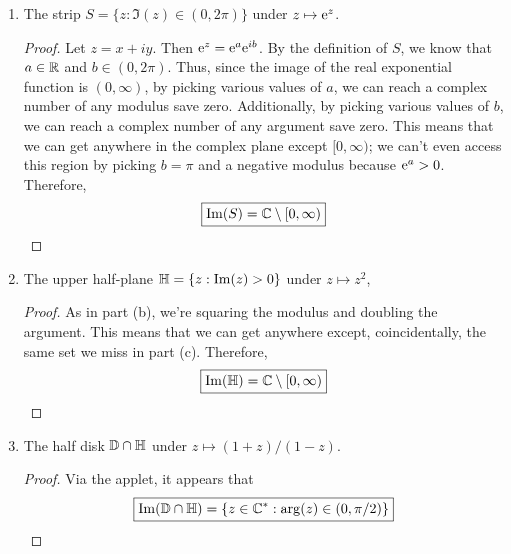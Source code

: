 \documentclass[../psets.tex]{subfiles}
\begin{document}
\begin{enumerate}[ref={A.\arabic*}]
\begin{enumerate}[ref={A.\theenumi\alph*}]
\begin{proof}
            \begin{equation*}
                \boxed{\im(\D\setminus\{0\}) = \D\setminus\{0\}}
            \end{equation*}
        \end{proof}
        \item The strip $S=\{z:\Im(z)\in(0,2\pi)\}$ under $z\mapsto\e[z]$.
        \begin{proof}
            Let $z=x+iy$. Then $\e[z]=\e[a]\e[ib]$. By the definition of $S$, we know that $a\in\R$ and $b\in(0,2\pi)$. Thus, since the image of the real exponential function is $(0,\infty)$, by picking various values of $a$, we can reach a complex number of any modulus save zero. Additionally, by picking various values of $b$, we can reach a complex number of any argument save zero. This means that we can get anywhere in the complex plane except $[0,\infty)$; we can't even access this region by picking $b=\pi$ and a negative modulus because $\e[a]>0$. Therefore,
            \begin{equation*}
                \boxed{\im(S) = \C\setminus[0,\infty)}
            \end{equation*}
        \end{proof}
        \item The upper half-plane $\Hh=\{z:\Im(z)>0\}$ under $z\mapsto z^2$,
        \begin{proof}
            As in part (b), we're squaring the modulus and doubling the argument. This means that we can get anywhere except, coincidentally, the same set we miss in part (c). Therefore,
            \begin{equation*}
                \boxed{\im(\Hh) = \C\setminus[0,\infty)}
            \end{equation*}
        \end{proof}
        \item \label{prb:1.A.5e}The half disk $\D\cap\Hh$ under $z\mapsto(1+z)/(1-z)$.
        \begin{proof}
            Via the applet, it appears that
            \begin{equation*}
                \boxed{\im(\D\cap\Hh) = \{z\in\C^*:\arg(z)\in(0,\pi/2)\}}
            \end{equation*}
        \end{proof}
    \end{enumerate}
\end{enumerate}
\end{document}
